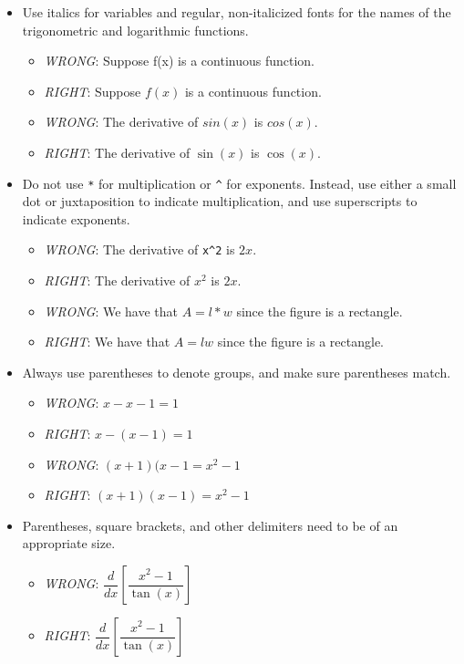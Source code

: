 \documentclass[11pt]{article}
\begin{document}
\begin{itemize}
	
	\item Use italics for variables and regular, non-italicized fonts for the names of the trigonometric and logarithmic functions. 
	\begin{itemize}
		\item \emph{WRONG}: Suppose f(x) is a continuous function. 
		\item \emph{RIGHT}: Suppose $f(x)$ is a continuous function. 
		\item \emph{WRONG}: The derivative of $sin(x)$ is $cos(x)$. 
		\item \emph{RIGHT}: The derivative of $\sin(x)$ is $\cos(x)$. 
	\end{itemize}
	
	\item Do not use \verb=*= for multiplication or \verb=^= for exponents. Instead, use either a small dot or juxtaposition to indicate multiplication, and use superscripts to indicate exponents. 
	\begin{itemize}
		\item \emph{WRONG}: The derivative of \verb=x^2= is $2x$. 
		\item \emph{RIGHT}: The derivative of $x^2$ is $2x$. 
		\item \emph{WRONG}: We have that $A = l \ast w$ since the figure is a rectangle. 
		\item \emph{RIGHT}: We have that $A = lw$ since the figure is a rectangle. 
	\end{itemize}
	
	\item Always use parentheses to denote groups, and make sure parentheses match. 
		\begin{itemize}
			\item \emph{WRONG}: $x - x - 1 = 1$
			\item \emph{RIGHT}: $x - (x-1) = 1$
			\item \emph{WRONG}: $(x+1)(x-1 = x^2 - 1$
			\item \emph{RIGHT}: $(x+1)(x-1) = x^2 - 1$
		\end{itemize}
		
	\item Parentheses, square brackets, and other delimiters need to be of an appropriate size. 
		\begin{itemize}
			\item \emph{WRONG}: $\dfrac{d}{dx}[ \dfrac{x^2 - 1}{\tan(x)} ]$
			\item \emph{RIGHT}: $\dfrac{d}{dx}\left[ \dfrac{x^2 - 1}{\tan(x)} \right]$
		\end{itemize}
	

\end{itemize}
\end{document}
